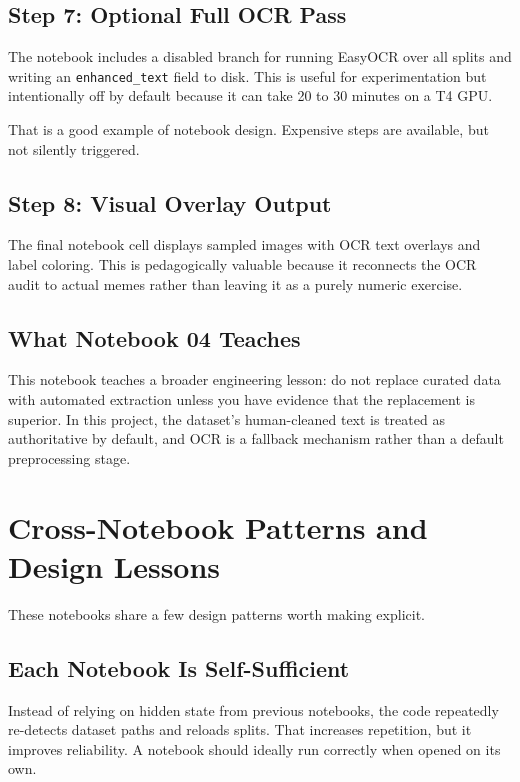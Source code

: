 \documentclass[11pt,a4paper]{report}
\begin{document}
\section{Step 7: Optional Full OCR Pass}

The notebook includes a disabled branch for running EasyOCR over all splits and writing an \texttt{enhanced\_text} field to disk. This is useful for experimentation but intentionally off by default because it can take 20 to 30 minutes on a T4 GPU.

That is a good example of notebook design. Expensive steps are available, but not silently triggered.

\section{Step 8: Visual Overlay Output}

The final notebook cell displays sampled images with OCR text overlays and label coloring. This is pedagogically valuable because it reconnects the OCR audit to actual memes rather than leaving it as a purely numeric exercise.

\section{What Notebook 04 Teaches}

This notebook teaches a broader engineering lesson: do not replace curated data with automated extraction unless you have evidence that the replacement is superior. In this project, the dataset's human-cleaned text is treated as authoritative by default, and OCR is a fallback mechanism rather than a default preprocessing stage.

\chapter{Cross-Notebook Patterns and Design Lessons}

These notebooks share a few design patterns worth making explicit.

\section{Each Notebook Is Self-Sufficient}

Instead of relying on hidden state from previous notebooks, the code repeatedly re-detects dataset paths and reloads splits. That increases repetition, but it improves reliability. A notebook should ideally run correctly when opened on its own.
\end{document}
